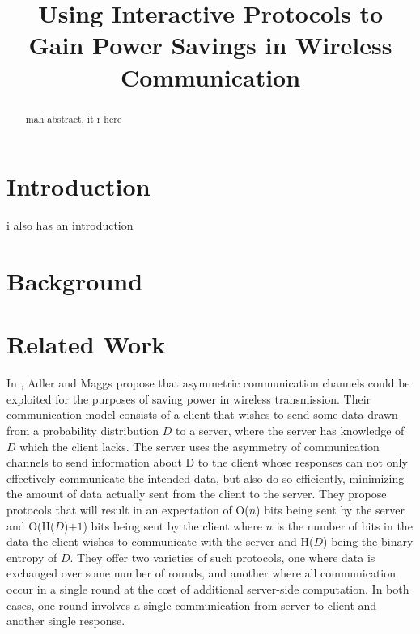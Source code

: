 \documentclass[conference]{IEEEtran}
\begin{document}
\title{Using Interactive Protocols to Gain Power Savings in Wireless Communication}

\author{
}
\maketitle

\begin{abstract}
mah abstract, it r here
\end{abstract}

\section{Introduction}

i also has an introduction

\section{Background}



\section{Related Work}

In \cite{Adler98}, Adler and Maggs propose that asymmetric
communication channels could be exploited for the purposes of saving
power in wireless transmission.  Their communication model consists of
a client that wishes to send some data drawn from a probability
distribution $D$ to a server, where the server has knowledge of $D$
which the client lacks.  The server uses the asymmetry of
communication channels to send information about D to the client whose
responses can not only effectively communicate the intended data, but
also do so efficiently, minimizing the amount of data actually sent
from the client to the server. They propose protocols that will result
in an expectation of O($n$) bits being sent by the server and
O(H($D$)$ + 1$) bits being sent by the client where $n$ is the number
of bits in the data the client wishes to communicate with the server
and H($D$) being the binary entropy of $D$.  They offer two varieties
of such protocols, one where data is exchanged over some number of
rounds, and another where all communication occur in a single round at
the cost of additional server-side computation.  In both cases, one
round involves a single communication from server to client and
another single response.\\
\end{document}

